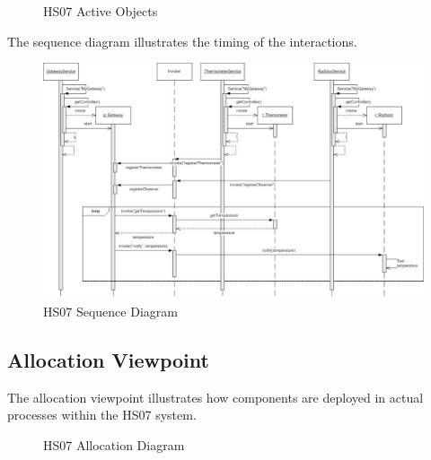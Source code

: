 \documentclass[a4paper,10pt]{article}
\begin{document}
\begin{figure}[!htb]
\caption{HS07 Active Objects}
\label{fig:cc_ao}
\end{figure}
The sequence diagram illustrates the timing of the interactions.
\begin{figure}[!htb]
\includegraphics[viewport=0 10 500 650,scale=0.3]{figures/sequence.pdf}
\caption{HS07 Sequence Diagram}
\label{fig:sequence}
\end{figure}


\subsection{Allocation Viewpoint}

The allocation viewpoint illustrates how components are deployed in actual processes
within the HS07 system.

\begin{figure}[!htb]
\caption{HS07 Allocation Diagram}
\label{fig:allocation}
\end{figure}
\end{document}

